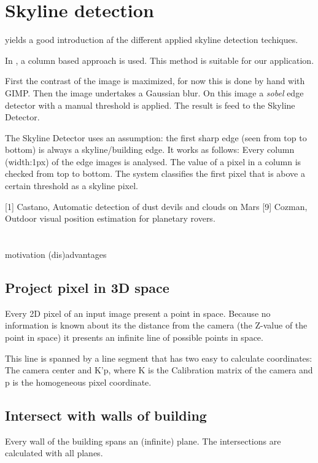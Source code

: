 \section{Skyline detection}
\cite{9} yields a good introduction af the different applied skyline detection
techiques.

In \cite{1}, a column based approach is used. This method is suitable for our
application.

First the contrast of the image is maximized, for now this is done by hand with
GIMP.  Then the image undertakes a Gaussian blur.  On this image a
\textit{sobel} edge detector with a manual threshold is applied.
The result is feed to the Skyline Detector.

The Skyline Detector uses an assumption: the first sharp edge (seen from top to
bottom) is always a skyline/building edge.  It works as follows:
Every column (width:1px) of the edge images is analysed. The value of a pixel
in a column is checked from top to bottom. The system classifies the first
pixel that is above a certain threshold as a skyline pixel.

[1] Castano, Automatic detection of dust devils and clouds on Mars
[9] Cozman, Outdoor visual position estimation for planetary rovers.



\section{}
motivation
(dis)advantages

\subsection{Project pixel in 3D space}
Every 2D pixel of an input image present a point in space. Because no information is known about its the distance from the camera (the Z-value of the point in space) it presents an infinite line of possible points in space.

This line is spanned by a line segment that has two easy to calculate coordinates:
The camera center and K'p, where K is the Calibration matrix of the camera and p is the homogeneous pixel coordinate.

\subsection{Intersect with walls of building}
Every wall of the building spans an (infinite) plane.
The intersections are calculated with all planes.


